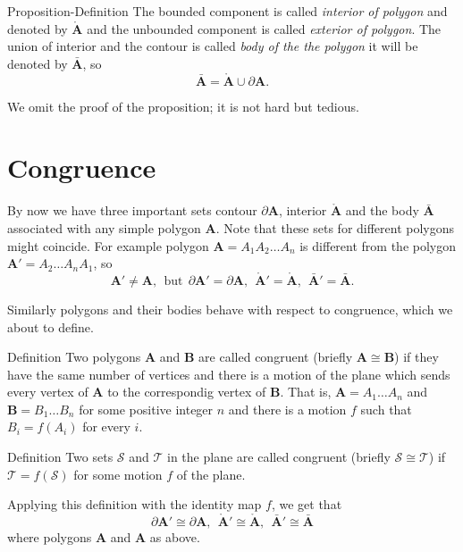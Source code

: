 {\begin{thm}{Proposition-Definition}
The bounded component is called \emph{interior of polygon} and denoted by $\mathring{\bm{A}}$
and the unbounded component is called \emph{exterior of polygon}.
The union of interior and the contour is called \emph{body of the the polygon} it will be denoted by $\bar{\bm{A}}$, so 
\[\bar{\bm{A}}=\mathring{\bm{A}}\cup \partial\bm{A}.\]
\end{thm}

We omit the proof of the proposition; it is not hard but tedious.

\section*{Congruence}

By now we have three important sets
contour $\partial\bm{A}$,
interior $\mathring{\bm{A}}$
and the body $\bar{\bm{A}}$
associated with any simple polygon $\bm{A}$.
Note that these sets for different polygons might coincide.
For example polygon $\bm{A}=A_1A_2\dots A_n$ is different from
the polygon $\bm{A}'=A_2\dots A_nA_1$, 
so 
\[\bm{A}'\ne \bm{A},
\ \ \text{but}\ \ 
\partial\bm{A}'=\partial\bm{A},\ \  
\mathring{\bm{A}}'=\mathring{\bm{A}},\ \ 
\bar{\bm{A}}'=\bar{\bm{A}}.\]

Similarly polygons and their bodies behave with respect to congruence,
which we about to define.

\begin{thm}{Definition}
Two polygons $\bm{A}$ and $\bm{B}$
are called congruent (briefly $\bm{A}\cong\bm{B}$)
if they have the same number of vertices 
and there is a motion of the plane 
which sends every vertex of $\bm{A}$ to the correspondig vertex of $\bm{B}$.
That is, $\bm{A}=A_1\dots A_n$ and $\bm{B}=B_1\dots B_n$
for some positive integer $n$ and there is a motion $f$
such that $B_i=f(A_i)$ for every $i$.
\end{thm}

\begin{thm}{Definition}\label{def:cong-sets}
Two sets $\mathcal{S}$ and $\mathcal{T}$ in the plane  
are called congruent 
(briefly $\mathcal{S}\cong \mathcal{T}$)
if 
$\mathcal{T}=f(\mathcal{S})$ for some motion $f$ of the plane.
\end{thm}

Applying this definition with the identity map $f$,
we get that
\[\partial\bm{A}'\cong\partial\bm{A},\ \  
\mathring{\bm{A}}'\cong\mathring{\bm{A}},\ \ 
\bar{\bm{A}}'\cong\bar{\bm{A}}\]
where polygons $\bm{A}$ and $\bm{A}$ as above.

}
